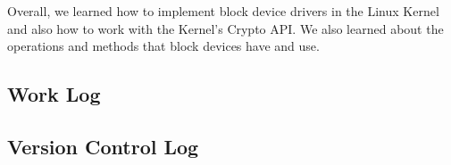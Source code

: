 \documentclass[journal, letterpaper, draftclsnofoot, onecolumn, 10pt]{IEEEtran}
\begin{document}



Overall, we learned how to implement block device drivers in the Linux Kernel and also how to work with the Kernel's Crypto API.
We also learned about the operations and methods that block devices have and use. \\


\subsection{Work Log}




\clearpage
\subsection{Version Control Log}



\FloatBarrier



\scalebox{0.8}{
}


\FloatBarrier
\end{document}
